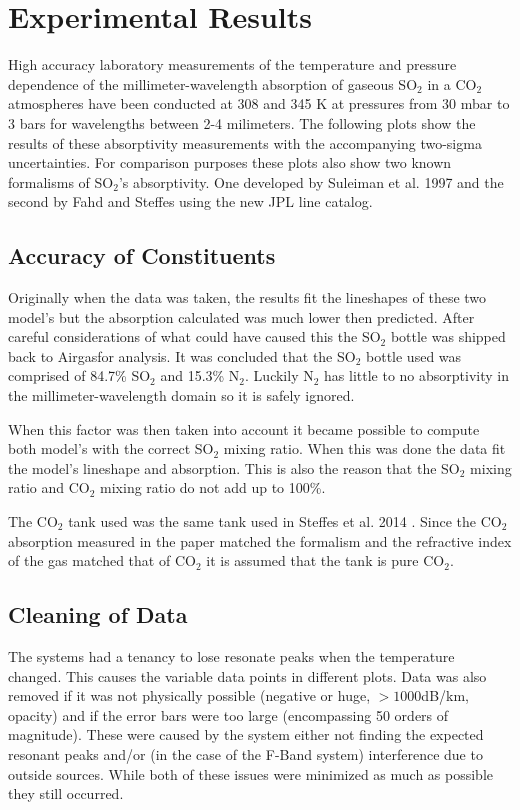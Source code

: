 \clearpage
\section{Experimental Results}
High accuracy laboratory measurements of the temperature and pressure dependence of the millimeter-wavelength absorption of gaseous SO$_2$ in a CO$_2$ atmospheres have been conducted at 308 and 345 K at pressures from 30 mbar to 3 bars for wavelengths between 2-4 milimeters. The following plots show the results of these absorptivity measurements with the accompanying two-sigma uncertainties. For comparison purposes these plots also show two known formalisms of SO$_2$'s absorptivity. One developed by Suleiman et al. 1997 \cite{Suleiman-thesis} and the second by Fahd and Steffes \cite{Fahd-thesis} using the new JPL line catalog. 

\subsection{Accuracy of Constituents}
Originally when the data was taken, the results fit the lineshapes of these two model's but the absorption calculated was much lower then predicted. After careful considerations of what could have caused this the SO$_2$ bottle was shipped back to Airgas\texttrademark for analysis. It was concluded that the SO$_2$ bottle used was comprised of 84.7\% SO$_2$ and 15.3\% N$_2$. Luckily N$_2$ has little to no absorptivity in the millimeter-wavelength domain so it is safely ignored.

When this factor was then taken into account it became possible to compute both model's with the correct SO$_2$ mixing ratio. When this was done the data fit the model's lineshape and absorption. This is also the reason that the SO$_2$ mixing ratio and CO$_2$ mixing ratio do not add up to 100\%.

The CO$_2$ tank used was the same tank used in Steffes et al. 2014 \cite{Steffes-2014}. Since the CO$_2$ absorption measured in the paper matched the formalism and the refractive index of the gas matched that of CO$_2$ it is assumed that the tank is pure CO$_2$.

\subsection{Cleaning of Data}

The systems had a tenancy to lose resonate peaks when the temperature changed. This causes the variable data points in different plots. Data was also removed if it was not physically possible (negative or huge, $>1000$dB/km, opacity) and if the error bars were too large (encompassing 50 orders of magnitude). These were caused by the system either not finding the expected resonant peaks and/or (in the case of the F-Band system) interference due to outside sources. While both of these issues were minimized as much as possible they still occurred. 

